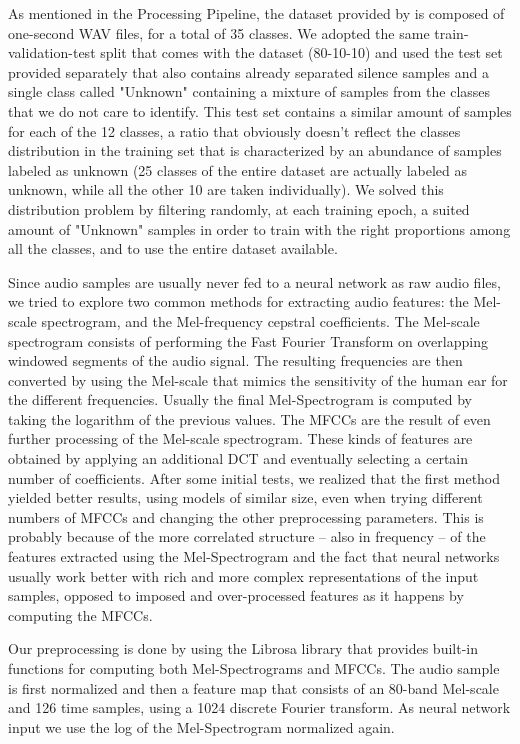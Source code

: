 As mentioned in the Processing Pipeline, the dataset provided by \cite{5} is composed of one-second WAV files, for a total of 35 classes. We adopted the same train-validation-test split that comes with the dataset (80-10-10) and used the test set provided separately \cite{6} that also contains already separated silence samples and a single class called "Unknown" containing a mixture of samples from the classes that we do not care to identify.
This test set contains a similar amount of samples for each of the 12 classes, a ratio that obviously doesn't reflect the classes distribution in the training set that is characterized by an abundance of samples labeled as unknown (25 classes of the entire dataset are actually labeled as unknown, while all the other 10 are taken individually). We solved this distribution problem by filtering randomly, at each training epoch, a suited amount of "Unknown" samples in order to train with the right proportions among all the classes, and to use the entire dataset available.


Since audio samples are usually never fed to a neural network as raw audio files, we tried to explore two common methods for extracting audio features: the Mel-scale spectrogram, and the Mel-frequency cepstral coefficients.
The Mel-scale spectrogram consists of performing the Fast Fourier Transform on overlapping windowed segments of the audio signal. The resulting frequencies are then converted by using the Mel-scale that mimics the sensitivity of the human ear for the different frequencies. Usually the final Mel-Spectrogram is computed by taking the logarithm of the previous values.
The MFCCs are the result of even further processing of the Mel-scale spectrogram. These kinds of features are obtained by applying an additional DCT and eventually selecting a certain number of coefficients.
After some initial tests, we realized that the first method yielded better results, using models of similar size, even when trying different numbers of MFCCs and changing the other preprocessing parameters. This is probably because of the more correlated structure -- also in frequency -- of the features extracted using the Mel-Spectrogram and the fact that neural networks usually work better with rich and more complex representations of the input samples, opposed to imposed and over-processed features as it happens by computing the MFCCs.


Our preprocessing is done by using the Librosa library \cite{7} that provides built-in functions for computing both Mel-Spectrograms and MFCCs. The audio sample is first normalized and then a feature map that consists of an 80-band Mel-scale and 126 time samples, using a 1024 discrete Fourier transform. As neural network input we use the log of the Mel-Spectrogram normalized again.



